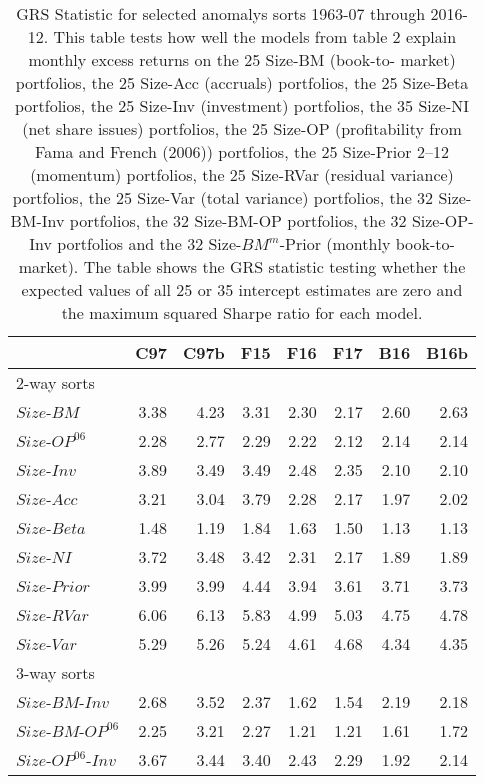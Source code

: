 
\begin{table}[!ht]
\centering
\caption{
\scriptsize{
GRS Statistic for selected anomalys sorts 1963-07 through 2016-12. This table tests how
well the models from table 2 explain monthly excess returns on the 25 Size-BM (book-to-
market) portfolios, the 25 Size-Acc (accruals) portfolios, the 25 Size-Beta portfolios,
the 25 Size-Inv (investment) portfolios, the 35 Size-NI (net share issues) portfolios, the
25 Size-OP (profitability from Fama and French (2006)) portfolios, the 25 Size-Prior 2–12
(momentum) portfolios, the 25 Size-RVar (residual variance) portfolios, the 25 Size-Var
(total variance) portfolios, the 32 Size-BM-Inv portfolios, the 32 Size-BM-OP portfolios,
the 32 Size-OP-Inv portfolios and the 32 Size-$BM^m$-Prior (monthly book-to-market). The
table shows the GRS statistic testing whether the expected values of all 25 or 35
intercept estimates are zero and the maximum squared Sharpe ratio for each model.
}
}
\begin{tabular}{lrrrrrrr}
  \toprule
                            &  C97  & C97b  &  F15  &  F16  &   F17  & B16  & B16b  \\
  \midrule
  
  \multicolumn{8}{l}{2-way sorts}  \\
    $Size$-$BM$             & 3.38  & 4.23  & 3.31  & 2.30  & 2.17  & 2.60  & 2.63  \\
    $Size$-$OP^{06}$        & 2.28  & 2.77  & 2.29  & 2.22  & 2.12  & 2.14  & 2.14  \\
    $Size$-$Inv$            & 3.89  & 3.49  & 3.49  & 2.48  & 2.35  & 2.10  & 2.10  \\
  [1em]

    $Size$-$Acc$            & 3.21  & 3.04  & 3.79  & 2.28  & 2.17  & 1.97  & 2.02  \\
    $Size$-$Beta$           & 1.48  & 1.19  & 1.84  & 1.63  & 1.50  & 1.13  & 1.13  \\
    $Size$-$NI$             & 3.72  & 3.48  & 3.42  & 2.31  & 2.17  & 1.89  & 1.89  \\
    $Size$-$Prior$          & 3.99  & 3.99  & 4.44  & 3.94  & 3.61  & 3.71  & 3.73  \\
    $Size$-$RVar$           & 6.06  & 6.13  & 5.83  & 4.99  & 5.03  & 4.75  & 4.78  \\
    $Size$-$Var$            & 5.29  & 5.26  & 5.24  & 4.61  & 4.68  & 4.34  & 4.35  \\
  [1em]

  \multicolumn{8}{l}{3-way sorts}  \\
    $Size$-$BM$-$Inv$       & 2.68  & 3.52  & 2.37  & 1.62  & 1.54  & 2.19  & 2.18  \\
    $Size$-$BM$-$OP^{06}$   & 2.25  & 3.21  & 2.27  & 1.21  & 1.21  & 1.61  & 1.72  \\
    $Size$-$OP^{06}$-$Inv$  & 3.67  & 3.44  & 3.40  & 2.43  & 2.29  & 1.92  & 2.14  \\
  [1em]


\end{tabular}
\end{table}
